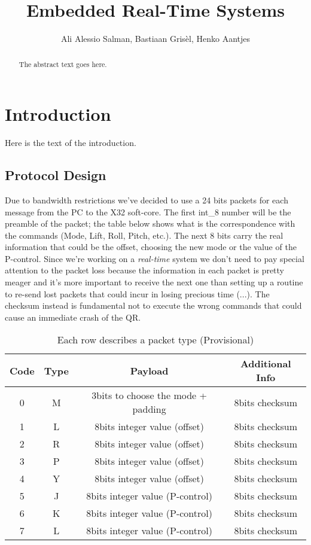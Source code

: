 \documentclass{article}
\begin{document}
\title{\textbf{Embedded Real-Time Systems}}
\author{Ali Alessio Salman, Bastiaan Gris\`el, Henko Aantjes}

\maketitle

\begin{abstract}
\begin{center}
The abstract text goes here. 
\end{center}
\end{abstract}

\section{Introduction}
Here is the text of the introduction.

\subsection{Protocol Design}
Due to bandwidth restrictions we've decided to use a 24 bits packets for each message from the PC to the X32 soft-core. The first int\_8 number will be the preamble of the packet; the table below shows what is the correspondence with the commands (Mode, Lift, Roll, Pitch, etc.). The next 8 bits carry the real information that could be the offset, choosing the new mode or the value of the P-control.  
Since we're working on a \textit{real-time} system we don't need to pay special attention to the packet loss because the information in each packet is pretty meager and it's more important to receive the next one than setting up a routine to re-send lost packets that could incur in losing precious time (...).  
The checksum instead is fundamental not to execute the wrong commands that could cause an immediate crash of the QR. 
\vspace{2em}


\begin{table}[h!]
\centering
 \begin{tabular}{||c|c|c|c||} 
 \hline
 Code & Type & Payload & Additional Info \\ [0.5ex] 
 \hline\hline
 0 & M & 3bits to choose the mode + padding & 8bits checksum \\ 
 \hline
 1 & L & 8bits integer value (offset) & 8bits checksum \\
 \hline
 2 & R & 8bits integer value (offset) & 8bits checksum \\
 \hline
 3 & P & 8bits integer value (offset) & 8bits checksum \\
 \hline
 4 & Y & 8bits integer value (offset) & 8bits checksum\\ 
 \hline
 5 & J & 8bits integer value (P-control) & 8bits checksum\\ 
 \hline
 6 & K & 8bits integer value (P-control) & 8bits checksum\\ 
 \hline
 7 & L & 8bits integer value (P-control) & 8bits checksum\\ 
 \hline
\end{tabular}
\caption{Each row describes a packet type (Provisional)}
\label{table:1}
\end{table}
\end{document}
